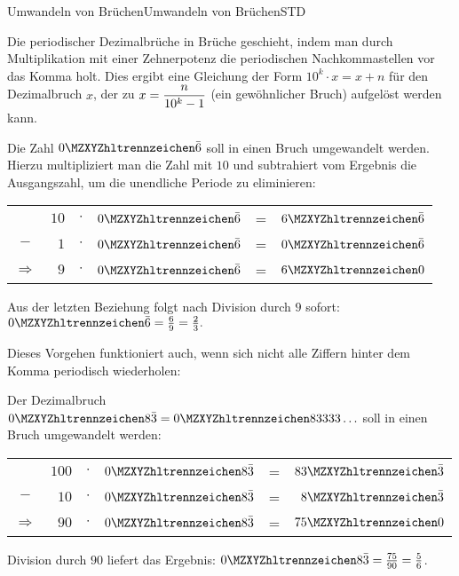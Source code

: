 \begin{MXContent}{Umwandeln von Brüchen}{Umwandeln von Brüchen}{STD}
\begin{MInfo}
Die  periodischer Dezimalbrüche in Brüche geschieht, indem man durch Multiplikation mit einer Zehnerpotenz
die periodischen Nachkommastellen vor das Komma holt. Dies ergibt eine Gleichung der Form $10^k\cdot x=x+n$
für den Dezimalbruch $x$, der zu $x=\dfrac{n}{10^k-1}$ (ein gewöhnlicher Bruch) aufgelöst werden kann.
\end{MInfo}

\begin{MExample}
	Die Zahl $\MZahl{0}{}\bar 6$ soll in einen Bruch umgewandelt werden. Hierzu multipliziert man die Zahl
mit $10$ und subtrahiert vom Ergebnis die Ausgangszahl, um die unendliche Periode
zu eliminieren:
\begin{center}
\begin{tabular}{crclcr}
	&$10$ & $\cdot$ & $\MZahl{0}{}\bar 6$ & = & $\MZahl{6}{}\bar 6$\\
	$-$ & $1$ & $\cdot$ & $\MZahl{0}{}\bar 6$ & = & $\MZahl{0}{}\bar 6$\\
\hline
$\Rightarrow$&$9$ & $\cdot$ & $\MZahl{0}{}\bar 6$ & = & $\MZahl{6}{0}$\\
\end{tabular}
\end{center}
Aus der letzten Beziehung folgt nach Division durch $9$ sofort:\quad $\displaystyle \MZahl{0}{}\bar 6 = \Mtfrac{6}{9} = \Mtfrac{2}{3}.$
\end{MExample}

Dieses Vorgehen funktioniert auch, wenn sich nicht alle Ziffern hinter dem Komma periodisch wiederholen:

\begin{MExample}
Der Dezimalbruch $\MZahl{0}{8}\bar{3}=\MZahl{0}{83333}\ldots$ soll in einen Bruch umgewandelt werden:
\begin{center}
\begin{tabular}{crclcr}
&$100$ & $\cdot$ & $\MZahl{0}{8}\bar 3$ & = & $\MZahl{83}{}\bar 3$\\
$-$&$10$ & $\cdot$ & $\MZahl{0}{8}\bar 3$ & = & $\MZahl{8}{}\bar 3$\\
\hline
$\Rightarrow$&$90$ & $\cdot$ & $\MZahl{0}{8}\bar 3$ & = & $\MZahl{75}{0}$\\
\end{tabular}
\end{center}
Division durch $90$ liefert das Ergebnis: $\displaystyle \MZahl{0}{8}\bar 3 = \Mtfrac{75}{90} = \Mtfrac{5}{6}$.
\end{MExample}


\end{MXContent}
